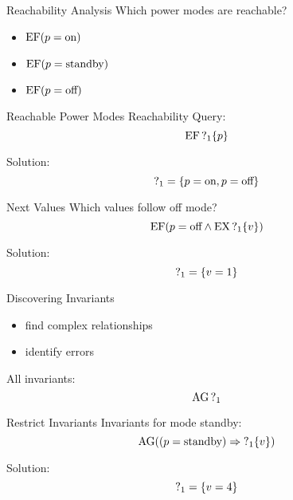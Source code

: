 \begin{frame}{Reachability Analysis}
  Which power modes are reachable?
  \begin{itemize}
    \item $\operatorname{EF} (p = \text{on})$
    \item $\operatorname{EF} (p = \text{standby})$
    \item $\operatorname{EF} (p = \text{off})$
  \end{itemize}
\end{frame}

\begin{frame}{Reachable Power Modes}
  Reachability Query:
  \[\operatorname{EF} \operatorname{?}_1\{p\}\]

  Solution:
  \[ \operatorname{?}_1 = \{p = \text{on}, p = \text{off}\} \]
\end{frame}

\begin{frame}{Next Values}
  Which values follow off mode?
  \[ \operatorname{EF} (p = \text{off} \land \operatorname{EX}\operatorname{?}_1\{v\}) \]

  Solution:
  \[ \operatorname{?}_1 = \{v = 1\} \]
\end{frame}

\begin{frame}{Discovering Invariants}
  \begin{itemize}
    \item find complex relationships
    \item identify errors
  \end{itemize}

  All invariants:
  \[ \operatorname{AG} \operatorname{?}_1 \]
\end{frame}

\begin{frame}{Restrict Invariants}
  Invariants for mode standby:
  \[ \operatorname{AG} ((p = \text{standby}) \Rightarrow \operatorname{?}_1\{v\}) \]

  Solution:
  \[ \operatorname{?}_1 = \{v = 4\} \]
\end{frame}

%  



